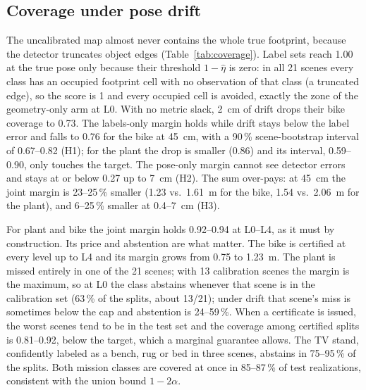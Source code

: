\documentclass[conference]{IEEEtran}
\theoremstyle{definition}
\begin{document}
\subsection{Coverage under pose drift}

\begin{table}[t]
\centering
\caption{Coverage and median margin (m), $1 - \alpha = 0.9$, 200 splits 13/8. Median ATE: L2 2~cm, L4 45~cm.
Abstention counts as covered; $^\dagger$ the arm abstains in at least half of the splits, the margin of the others is
shown. The geometry-only margin is measured from all occupied cells.}
\label{tab:coverage}
\setlength{\tabcolsep}{2.6pt}
\footnotesize

\end{table}

The uncalibrated map almost never contains the whole true footprint, because the detector truncates object edges
(Table~\ref{tab:coverage}). Label sets reach 1.00 at the true pose only because their threshold $1 - \hat\eta$ is zero:
in all 21 scenes every class has an occupied footprint cell with no observation of that class (a truncated edge), so
the score is 1 and every occupied cell is avoided, exactly the zone of the geometry-only arm at L0. With no metric slack,
2~cm of drift drops their bike coverage to 0.73. The labels-only margin holds while drift stays below the label error
and falls to 0.76 for the bike at 45~cm, with a 90\,\% scene-bootstrap interval of 0.67--0.82 (H1); for the plant the
drop is smaller (0.86) and its interval, 0.59--0.90, only touches the target. The pose-only margin cannot see detector errors and stays at or below 0.27 up to
7~cm (H2). The sum over-pays: at 45~cm the joint margin is 23--25\,\% smaller (1.23 vs.\ 1.61~m for the bike, 1.54
vs.\ 2.06~m for the plant), and 6--25\,\% smaller at 0.4--7~cm (H3).

For plant and bike the joint margin holds 0.92--0.94 at L0--L4, as it must by construction. Its price and abstention
are what matter. The bike is certified at every level up to L4 and its margin grows from 0.75 to 1.23~m. The plant is
missed entirely in one of the 21 scenes; with 13 calibration scenes the margin is the maximum, so at L0 the class
abstains whenever that scene is in the calibration set (63\,\% of the splits, about 13/21); under drift that scene's
miss is sometimes below the cap and abstention is 24--59\,\%. When a certificate is issued, the worst scenes tend to be
in the test set and the coverage among certified splits is 0.81--0.92, below the target, which a marginal guarantee
allows. The TV stand, confidently labeled as a bench, rug or bed in three scenes, abstains in 75--95\,\% of the splits. Both mission classes are covered at once in
85--87\,\% of test realizations, consistent with the union bound $1 - 2\alpha$.
\end{document}
